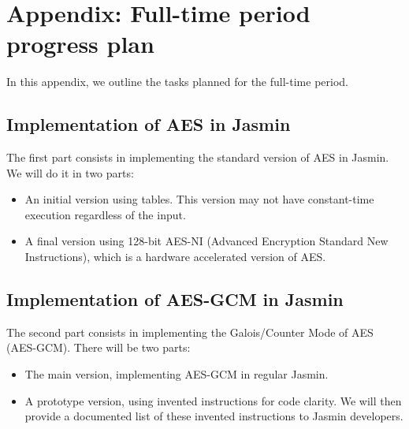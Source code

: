 \documentclass[runningheads]{llncs}
\begin{document}
\begin{thebibliography}{8}





\end{thebibliography}



\newpage
\appendix
\section{Appendix: Full-time period progress plan}

In this appendix, we outline the tasks planned for the full-time period.

\subsection{Implementation of AES in Jasmin}
The first part consists in implementing the standard version of AES in Jasmin. We will do it in two parts:
\begin{itemize}
    \item An initial version using tables. This version may not have constant-time execution regardless of the input.
    \item A final version using 128-bit AES-NI (Advanced Encryption Standard New Instructions), which is a hardware accelerated version of AES.
\end{itemize}

\subsection{Implementation of AES-GCM in Jasmin}
The second part consists in implementing the Galois/Counter Mode of AES (AES-GCM). There will be two parts:
\begin{itemize}
    \item The main version, implementing AES-GCM in regular Jasmin.
    \item A prototype version, using invented instructions for code clarity. We will then provide a documented list of these invented instructions to Jasmin developers.
\end{itemize}
\end{document}
